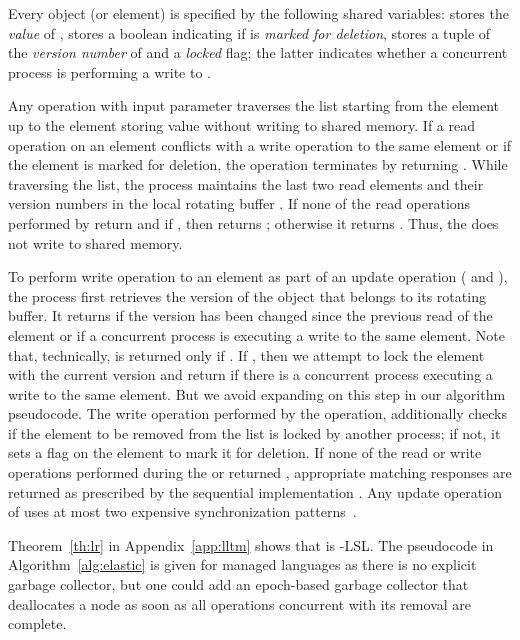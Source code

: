 \documentclass[11pt,pdftex,letterpaper]{article}
\begin{document}
 

Every object (or element)  is
specified 
by the following shared variables: 
stores the \emph{value}  of ,  stores
a boolean indicating if  is \emph{marked for deletion}, 
 stores a tuple of the \emph{version number} of  and a \emph{locked} flag; 
the latter indicates whether a concurrent process is performing a write to .

Any operation with input parameter  traverses the list starting from the
 element up to the element storing value  without writing to shared memory.
If a read operation on an element conflicts with a write operation to the same element or
if the element is marked for deletion, the operation terminates by returning .
While traversing the list, the process maintains the last two read elements and their version numbers 
in the local rotating buffer . If none of the read operations performed by  return 
and if , then  returns ; otherwise it returns .
Thus, the  does not write to shared memory.

To perform write operation to an element as part of an update operation ( and ), the process 
first retrieves the version of the object that belongs to its rotating buffer.
It returns  if the version has been changed since the previous read of the element 
or if a concurrent process is executing a write to the same element.
Note that, technically,  is returned only if .
If , then we attempt to lock the element with the current version
and return  if there is a concurrent process executing a write to the same element.
But we avoid expanding
on this step in our algorithm pseudocode.
The write operation performed by the  operation, additionally checks if the element to be removed
from the list is locked by another process; if not, it sets a flag on the element to mark it for deletion.
If none of the read or write operations performed during the  or  returned ,
appropriate matching responses are returned as prescribed by the sequential implementation .
Any update operation of  uses at most two expensive synchronization
patterns~\cite{AGK11-popl}.

Theorem~\ref{th:lr} in Appendix~\ref{app:lltm} shows that  is -LSL.
The pseudocode in Algorithm~\ref{alg:elastic} is given for managed languages as there is no explicit garbage collector, 
but one could add 
an epoch-based garbage collector that deallocates a node as soon as all operations concurrent with its removal are complete.
\end{document}
